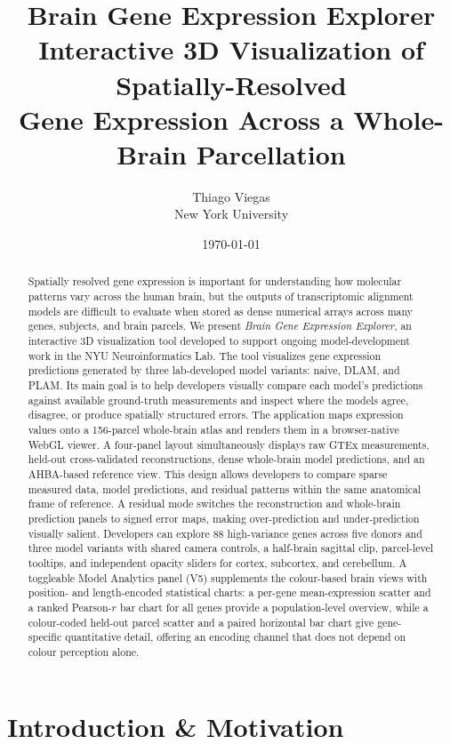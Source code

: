 \documentclass[11pt,letterpaper]{article}
\title{\textbf{Brain Gene Expression Explorer}\\
  \large Interactive 3D Visualization of Spatially-Resolved\\
  Gene Expression Across a Whole-Brain Parcellation}
\author{Thiago Viegas\\
  \small New York University}
\date{\today}
\begin{document}
\maketitle

\begin{abstract}
Spatially resolved gene expression is important for understanding how molecular
patterns vary across the human brain, but the outputs of transcriptomic alignment
models are difficult to evaluate when stored as dense numerical arrays across
many genes, subjects, and brain parcels.
We present \emph{Brain Gene Expression Explorer}, an interactive 3D visualization
tool developed to support ongoing model-development work in the NYU
Neuroinformatics Lab.
The tool visualizes gene expression predictions generated by three lab-developed
model variants: naive, DLAM, and PLAM.
Its main goal is to help developers visually compare each model's predictions
against available ground-truth measurements and inspect where the models agree,
disagree, or produce spatially structured errors. The application maps expression values onto a 156-parcel whole-brain atlas and
renders them in a browser-native WebGL viewer.
A four-panel layout simultaneously displays raw GTEx measurements, held-out
cross-validated reconstructions, dense whole-brain model predictions, and an
AHBA-based reference view.
This design allows developers to compare sparse measured data, model predictions,
and residual patterns within the same anatomical frame of reference.
A residual mode switches the reconstruction and whole-brain prediction panels
to signed error maps, making over-prediction and under-prediction visually
salient.
Developers can explore 88 high-variance genes across five donors and three model
variants with shared camera controls, a half-brain sagittal clip, parcel-level
tooltips, and independent opacity sliders for cortex, subcortex, and cerebellum.
A toggleable Model Analytics panel (V5) supplements the colour-based brain views
with position- and length-encoded statistical charts: a per-gene mean-expression
scatter and a ranked Pearson-$r$ bar chart for all genes provide a population-level
overview, while a colour-coded held-out parcel scatter and a paired horizontal bar
chart give gene-specific quantitative detail, offering an encoding channel that does
not depend on colour perception alone.
\end{abstract}

\section{Introduction \& Motivation}
\label{sec:intro}
\end{document}
